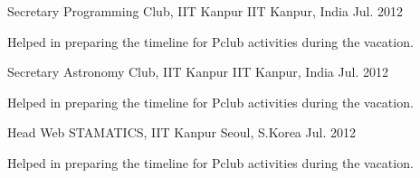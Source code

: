 \begin{cventries}
  \cventry
    {Secretary }
    {Programming Club, IIT Kanpur}
    {IIT Kanpur, India}
    {Jul. 2012}
    {
      \begin{cvitems}
        \item {Helped in preparing the timeline for Pclub activities during the vacation.}
      \end{cvitems}
    }
  \cventry
    {Secretary }
    {Astronomy Club, IIT Kanpur}
    {IIT Kanpur, India}
    {Jul. 2012}
    {
      \begin{cvitems}
        \item {Helped in preparing the timeline for Pclub activities during the vacation.}
      \end{cvitems}
    }
  \cventry
    {Head Web }
    {STAMATICS, IIT Kanpur}
    {Seoul, S.Korea}
    {Jul. 2012}
    {
      \begin{cvitems}
        \item {Helped in preparing the timeline for Pclub activities during the vacation.}
      \end{cvitems}
    }
\end{cventries}

